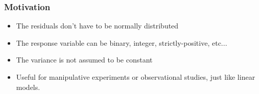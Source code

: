 \documentclass[color=usenames,dvipsnames]{beamer}\usepackage[]{graphicx}\usepackage[]{color}
\begin{document}
\begin{frame}
  \frametitle{Motivation}
  \large
  \begin{itemize}%
    \item<2-> The residuals don't have to be normally distributed
    \item<3-> The response variable can be binary, integer,
      strictly-positive, etc...
    \item<4-> The variance is not assumed to be constant
    \item<5-> Useful for manipulative experiments or observational
      studies, just like linear models.
  \end{itemize}
  \vfill
\end{frame}




\end{document}
